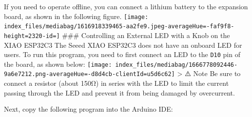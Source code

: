\documentclass[
  letterpaper,
  DIV=11,
  numbers=noendperiod]{scrreprt}
\begin{document}
If you need to operate offline, you can connect a lithium battery to the
expansion board, as shown in the following figure.
\texttt{[image: index\_files/mediabag/1616918339465-aa2fe9.jpeg-averageHue=-faf9f8-height=2320-id=]}
\#\#\# Controlling an External LED with a Knob on the XIAO ESP32C3 The
Seeed XIAO ESP32C3 does not have an onboard LED for users. To run this
program, you need to first connect an LED to the \texttt{D10} pin of the
board, as shown below:
\texttt{[image: index\_files/mediabag/1666778092446-9a6e7212.png-averageHue=-d8d4cb-clientId=u5d6c62]}
\textgreater{} ⚠️ Note Be sure to connect a resistor (about 150Ω) in
series with the LED to limit the current passing through the LED and
prevent it from being damaged by overcurrent.

Next, copy the following program into the Arduino IDE:
\end{document}
